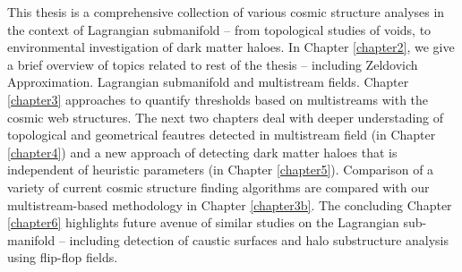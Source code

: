 This thesis is a comprehensive collection of various cosmic structure analyses in the context of Lagrangian submanifold -- from topological studies of voids, to environmental investigation of dark matter haloes. In Chapter \ref{chapter2}, we give a brief overview of topics related to rest of the thesis -- including Zeldovich Approximation. Lagrangian submanifold and multistream fields. Chapter \ref{chapter3} approaches to quantify thresholds based on multistreams with the cosmic web structures. The next two chapters deal with deeper understading of topological and geometrical feautres detected in multistream field (in Chapter \ref{chapter4}) and a new approach of detecting dark matter haloes that is independent of heuristic parameters (in Chapter \ref{chapter5}). Comparison of a variety of current cosmic structure finding algorithms are compared with our multistream-based methodology in Chapter \ref{chapter3b}. The concluding Chapter \ref{chapter6} highlights future avenue of similar studies on the Lagrangian sub-manifold -- including detection of caustic surfaces and halo substructure analysis using flip-flop fields. 




